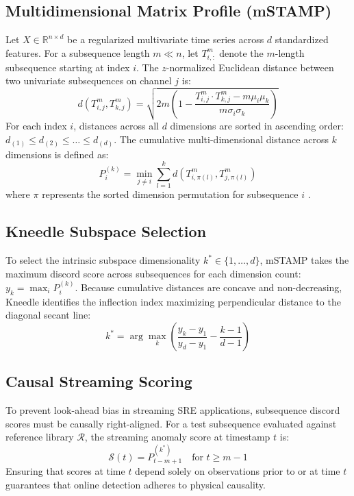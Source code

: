 \documentclass[10pt,twocolumn]{article}
\begin{document}
\subsection{Multidimensional Matrix Profile (mSTAMP)}
Let $X \in \mathbb{R}^{n \times d}$ be a regularized multivariate time series across $d$ standardized features. For a subsequence length $m \ll n$, let $T_{i, :}^m$ denote the $m$-length subsequence starting at index $i$. The $z$-normalized Euclidean distance between two univariate subsequences on channel $j$ is:
\begin{equation}
d(T_{i, j}^m, T_{k, j}^m) = \sqrt{2m \left( 1 - \frac{T_{i, j}^m \cdot T_{k, j}^m - m \mu_i \mu_k}{m \sigma_i \sigma_k} \right)}
\end{equation}
For each index $i$, distances across all $d$ dimensions are sorted in ascending order: $d_{(1)} \le d_{(2)} \le \dots \le d_{(d)}$. The cumulative multi-dimensional distance across $k$ dimensions is defined as:
\begin{equation}
P_{i}^{(k)} = \min_{j \ne i} \sum_{l=1}^k d(T_{i, \pi(l)}^m, T_{j, \pi(l)}^m)
\end{equation}
where $\pi$ represents the sorted dimension permutation for subsequence $i$ \cite{yeh2017multidimensional}.

\subsection{Kneedle Subspace Selection}
To select the intrinsic subspace dimensionality $k^* \in \{1, \dots, d\}$, mSTAMP takes the maximum discord score across subsequences for each dimension count: $y_k = \max_{i} P_{i}^{(k)}$. Because cumulative distances are concave and non-decreasing, Kneedle \cite{satopaa2011finding} identifies the inflection index maximizing perpendicular distance to the diagonal secant line:
\begin{equation}
k^* = \arg\max_k \left( \frac{y_k - y_1}{y_d - y_1} - \frac{k - 1}{d - 1} \right)
\end{equation}

\subsection{Causal Streaming Scoring}
To prevent look-ahead bias in streaming SRE applications, subsequence discord scores must be causally right-aligned. For a test subsequence evaluated against reference library $\mathcal{R}$, the streaming anomaly score at timestamp $t$ is:
\begin{equation}
\mathcal{S}(t) = P_{t - m + 1}^{(k^*)} \quad \text{for } t \ge m - 1
\end{equation}
Ensuring that scores at time $t$ depend solely on observations prior to or at time $t$ guarantees that online detection adheres to physical causality.
\end{document}
